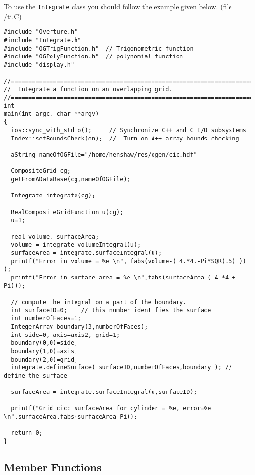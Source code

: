 To use the {\tt Integrate} class you should follow the example given below.
(file {\ff \examples/ti.C})
{\footnotesize
\begin{verbatim}
#include "Overture.h"
#include "Integrate.h"
#include "OGTrigFunction.h"  // Trigonometric function
#include "OGPolyFunction.h"  // polynomial function
#include "display.h"

//================================================================================
//  Integrate a function on an overlapping grid.
//================================================================================
int 
main(int argc, char **argv)
{
  ios::sync_with_stdio();     // Synchronize C++ and C I/O subsystems
  Index::setBoundsCheck(on);  //  Turn on A++ array bounds checking

  aString nameOfOGFile="/home/henshaw/res/ogen/cic.hdf"
    
  CompositeGrid cg;
  getFromADataBase(cg,nameOfOGFile);
    
  Integrate integrate(cg);

  RealCompositeGridFunction u(cg);
  u=1;
    
  real volume, surfaceArea;
  volume = integrate.volumeIntegral(u);
  surfaceArea = integrate.surfaceIntegral(u);
  printf("Error in volume = %e \n", fabs(volume-( 4.*4.-Pi*SQR(.5) )) );
  printf("Error in surface area = %e \n",fabs(surfaceArea-( 4.*4 + Pi)));
    
  // compute the integral on a part of the boundary.
  int surfaceID=0;    // this number identifies the surface
  int numberOfFaces=1;
  IntegerArray boundary(3,numberOfFaces);
  int side=0, axis=axis2, grid=1;
  boundary(0,0)=side;
  boundary(1,0)=axis;
  boundary(2,0)=grid;
  integrate.defineSurface( surfaceID,numberOfFaces,boundary ); // define the surface
      
  surfaceArea = integrate.surfaceIntegral(u,surfaceID);        

  printf("Grid cic: surfaceArea for cylinder = %e, error=%e \n",surfaceArea,fabs(surfaceArea-Pi));

  return 0;
}
\end{verbatim}
}


\subsection{Member Functions}



